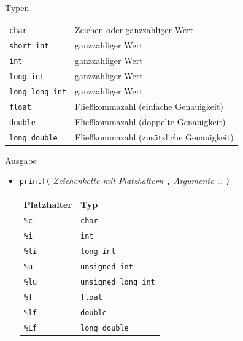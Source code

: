 \documentclass[
  aspectratio=1610,
]{beamer}
\begin{document}
\begin{frame}{Typen}
  \begin{center}
    \begin{tabular}{ll}
      \toprule
      \texttt{char} & Zeichen oder ganzzahliger Wert\\
      \texttt{short int} & ganzzahliger Wert\\
      \texttt{int} & ganzzahliger Wert\\
      \texttt{long int} & ganzzahliger Wert\\
      \texttt{long long int} & ganzzahliger Wert\\
      \texttt{float} & Fließkommazahl (einfache Genauigkeit)\\
      \texttt{double} & Fließkommazahl (doppelte Genauigkeit)\\
      \texttt{long double} & Fließkommazahl (zusätzliche Genauigkeit)\\
      \bottomrule
    \end{tabular}
  \end{center}
\end{frame}

\begin{frame}{Ausgabe}
  \begin{itemize}
    \item \texttt{printf(} %
      \textit{Zeichenkette mit Platzhaltern}
      \texttt{,}
      \textit{Argumente \ldots}
      \texttt{)}\\[2ex] %

      \begin{tabular}{ll}
        \toprule
        Platzhalter & Typ\\
        \midrule
        \texttt{\%c} & \texttt{char}\\
        \texttt{\%i} & \texttt{int}\\
        \texttt{\%li} & \texttt{long int}\\
        \texttt{\%u} & \texttt{unsigned int}\\
        \texttt{\%lu} & \texttt{unsigned long int}\\
        \texttt{\%f} & \texttt{float}\\
        \texttt{\%lf} & \texttt{double}\\
        \texttt{\%Lf} & \texttt{long double}\\
        \bottomrule
      \end{tabular}
  \end{itemize}
\end{frame}
\end{document}
